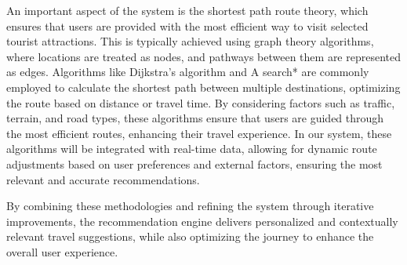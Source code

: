 An important aspect of the system is the shortest path route theory, which ensures that users are provided with the most efficient way to visit selected tourist attractions. This is typically achieved using graph theory algorithms, where locations are treated as nodes, and pathways between them are represented as edges. Algorithms like Dijkstra's algorithm and A search* are commonly employed to calculate the shortest path between multiple destinations, optimizing the route based on distance or travel time. By considering factors such as traffic, terrain, and road types, these algorithms ensure that users are guided through the most efficient routes, enhancing their travel experience. In our system, these algorithms will be integrated with real-time data, allowing for dynamic route adjustments based on user preferences and external factors, ensuring the most relevant and accurate recommendations.

By combining these methodologies and refining the system through iterative improvements, the recommendation engine delivers personalized and contextually relevant travel suggestions, while also optimizing the journey to enhance the overall user experience.